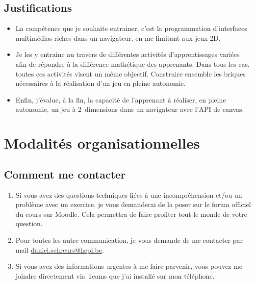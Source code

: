 \subsection{Justifications}
\begin{itemize}
    \item La compétence que je souhaite entrainer, c'est la programmation d'interfaces multimédias riches dans un navigateur, en me limitant aux jeux 2D.
    \item Je les y entraine au travers de différentes activités d'apprentissages variées afin de répondre à la différence mathétique des apprenants. Dans tous les cas, toutes ces activités visent un même objectif. Construire ensemble les briques nécessaires à la réalisation d'un jeu en pleine autonomie.
    \item Enfin, j'évalue, à la fin, la capacité de l'apprenant à réaliser, en pleine autonomie, un jeu à 2~dimensions dans un navigateur avec l'API de canvas.
\end{itemize}
\clearpage

\section{Modalités organisationnelles}
\subsection{Comment me contacter}
\begin{enumerate}
    \item Si vous avez des questions techniques liées à une incompréhension et/ou un problème avec un exercice, je vous demanderai de la poser sur le forum officiel du cours sur Moodle. Cela permettra de faire profiter tout le monde de votre question.
    \item Pour toutes les autre communication, je vous demande de me contacter par mail \href{mailto:daniel.schreurs@hepl.be}{daniel.schreurs@hepl.be}.
    \item Si vous avez des informations urgentes à me faire parvenir, vous pouvez me joindre directement via Teams que j'ai installé sur mon téléphone.
\end{enumerate}

